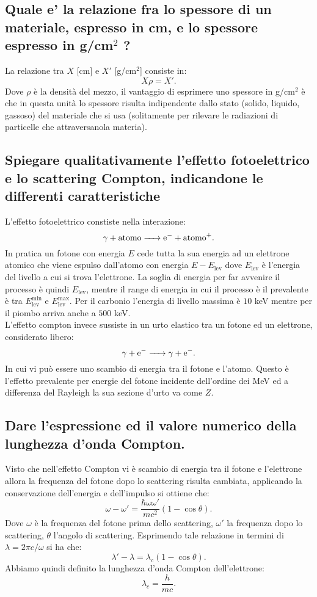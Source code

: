 \subsection[]{Quale e' la relazione fra lo spessore di un materiale, espresso in cm, e lo spessore espresso in g/cm$^2$ ?
}
La relazione tra $X$ [cm] e $X'$ [g/cm$^2$] consiste in:
\[
	X\rho = X'
.\] 
Dove $\rho$ è la densità del mezzo, il vantaggio di esprimere uno spessore in g/cm$^2$ è che in questa unità lo spessore risulta indipendente dallo stato (solido, liquido, gassoso) del materiale che si usa (solitamente per rilevare le radiazioni di particelle che attraversanola materia).
\subsection[]{Spiegare qualitativamente l’effetto fotoelettrico e lo scattering Compton, indicandone le differenti caratteristiche
}
L'effetto fotoelettrico constiste nella interazione:
\[
	\ce{\ce{\gamma} +  \text{atomo} -> \ce{e^-} + \text{atomo}+}
.\] 
In pratica un fotone con energia $E$ cede tutta la sua energia ad un elettrone atomico che viene espulso dall'atomo con energia $E-E_{\text{lev}}$ dove $E_{\text{lev}}$ è l'energia del livello a cui si trova l'elettrone. La soglia di energia per far avvenire il processo è quindi $E_{\text{lev}}$, mentre il range di energia in cui il processo è il prevalente è tra $E^{\text{min}}_{\text{lev}}$ e $E^{\text{max}}_{\text{lev}}$. Per il carbonio l'energia di livello massima è $10$ keV mentre per il piombo arriva anche a $500$ keV.\\
L'effetto compton invece sussiste in un urto elastico tra un fotone ed un elettrone, considerato libero:
\[
	\ce{\ce{\gamma} + e- -> \ce{\gamma} + e- }
.\] 
In cui vi può essere uno scambio di energia tra il fotone e l'atomo. Questo è l'effetto prevalente per energie del fotone incidente dell'ordine dei MeV ed a differenza del Rayleigh la sua sezione d'urto va come $Z$.
\subsection[]{Dare l'espressione ed il valore numerico della lunghezza d'onda Compton.
}
Visto che nell'effetto Compton vi è scambio di energia tra il fotone e l'elettrone allora la frequenza del fotone dopo lo scattering risulta cambiata, applicando la conservazione dell'energia e dell'impulso si ottiene che:
\[
	\omega-\omega'= \frac{\hbar \omega\omega'}{mc^2}\left( 1-\cos\theta \right) 
.\]
Dove $\omega$ è la frequenza del fotone prima dello scattering, $\omega'$ la frequenza dopo lo scattering, $\theta$ l'angolo di scattering.
Esprimendo tale relazione in termini di $\lambda= 2\pi c/ \omega$ si ha che:
\[
	\lambda'-\lambda= \lambda_{c}\left( 1-\cos\theta \right) 
.\] 
Abbiamo quindi definito la lunghezza d'onda Compton dell'elettrone:
\[
	\lambda_{c}=\frac{h}{mc}
.\] 
